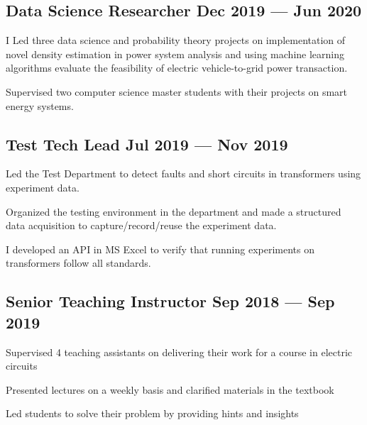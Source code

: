 \documentclass[letter,11pt]{article}
\begin{document}
\subsection{{Data Science Researcher \hfill Dec 2019 --- Jun 2020}}
\begin{zitemize}
	\item I Led three data science and probability theory projects on implementation of novel density estimation in power system analysis and using machine learning algorithms evaluate the feasibility of electric vehicle-to-grid power transaction.
	\item Supervised two computer science master students with their projects on smart energy systems.
\end{zitemize}

\subsection{{Test Tech Lead \hfill Jul 2019 --- Nov 2019}}
\begin{zitemize}
	\item Led the Test Department to detect faults and short circuits in transformers using experiment data.
	\item Organized the testing environment in the department and made a structured data acquisition to capture/record/reuse the experiment data.
	\item I developed an API in MS Excel to verify that running experiments on transformers follow all standards.
\end{zitemize}

\subsection{Senior Teaching Instructor \hfill Sep 2018 --- Sep 2019}
\begin{zitemize}
	\item Supervised 4 teaching assistants on delivering their work for a course in electric circuits
	\item Presented lectures on a weekly basis and clarified materials in the textbook
	\item Led students to solve their problem by providing hints and insights
\end{zitemize}
\end{document}
